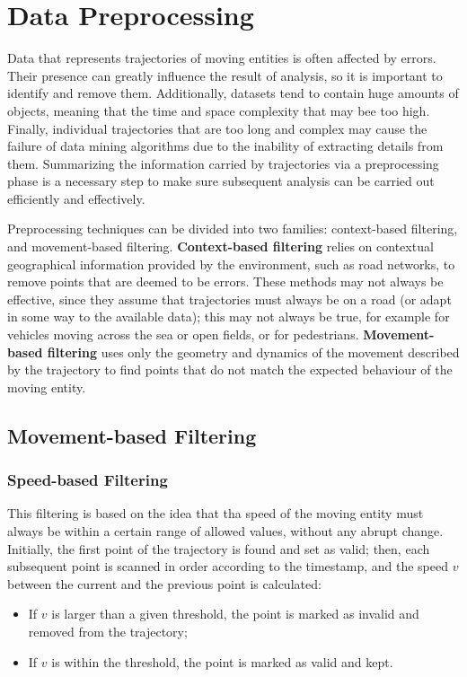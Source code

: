 \chapter{Data Preprocessing}

Data that represents trajectories of moving entities is often affected by errors. Their presence can greatly influence the result of analysis, so it is important to identify and remove them. Additionally, datasets tend to contain huge amounts of objects, meaning that the time and space complexity that may bee too high. Finally, individual trajectories that are too long and complex may cause the failure of data mining algorithms due to the inability of extracting details from them. Summarizing the information carried by trajectories via a preprocessing phase is a necessary step to make sure subsequent analysis can be carried out efficiently and effectively.

Preprocessing techniques can be divided into two families: context-based filtering, and movement-based filtering. \textbf{Context-based filtering} relies on contextual geographical information provided by the environment, such as road networks, to remove points that are deemed to be errors. These methods may not always be effective, since they assume that trajectories must always be on a road (or adapt in some way to the available data); this may not always be true, for example for vehicles moving across the sea or open fields, or for pedestrians. \textbf{Movement-based filtering} uses only the geometry and dynamics of the movement described by the trajectory to find points that do not match the expected behaviour of the moving entity.

\section{Movement-based Filtering}

\subsection{Speed-based Filtering}

This filtering is based on the idea that tha speed of the moving entity must always be within a certain range of allowed values, without any abrupt change. Initially, the first point of the trajectory is found and set as valid; then, each subsequent point is scanned in order according to the timestamp, and the speed $v$ between the current and the previous point is calculated:
\begin{itemize}
    \item If $v$ is larger than a given threshold, the point is marked as invalid and removed from the trajectory;
    \item If $v$ is within the threshold, the point is marked as valid and kept.
\end{itemize}

